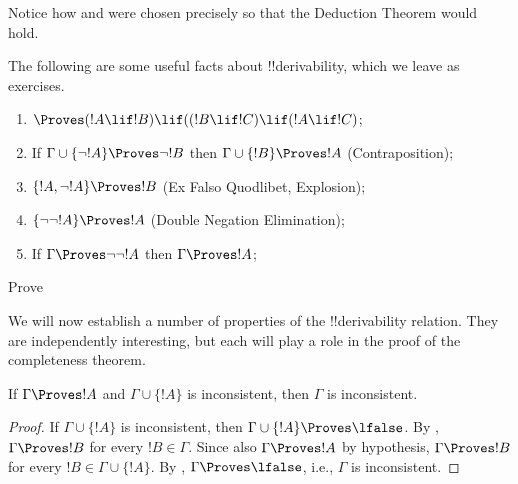 Notice how  and  were chosen
precisely so that the Deduction Theorem would hold.

The following are some useful facts about !!{derivability}, which we
leave as exercises.

\begin{prop}
\begin{enumerate}
\item $\Proves (!A \lif !B) \lif ((!B \lif !C)
  \lif (!A \lif !C)$; 
\item If $\Gamma \cup \{ \lnot !A\}
  \Proves \lnot !B$ then $\Gamma \cup \{ !B\} \Proves
  !A$ (Contraposition); 
\item  $\{ !A, \lnot!A\} \Proves
    !B$ (Ex Falso Quodlibet, Explosion); 
\item  $\{ \lnot\lnot!A\} \Proves
  !A$ (Double Negation Elimination);
\item If $\Gamma \Proves \lnot\lnot!A$ then $\Gamma \Proves
  !A$;
\end{enumerate}
\end{prop}




\begin{prob}
  Prove 
\end{prob}










We will now establish a number of properties of the !!{derivability}
relation.  They are independently interesting, but each will play a
role in the proof of the completeness theorem.

\begin{prop}
  If $\Gamma \Proves !A$ and $\Gamma \cup \{!A\}$ is inconsistent,
  then $\Gamma$ is inconsistent.
\end{prop}

\begin{proof}
  If $\Gamma \cup \{!A\}$ is inconsistent, then $\Gamma \cup \{!A\}
  \Proves \lfalse$. By , $\Gamma \Proves
  !B$ for every $!B \in \Gamma$. Since also $\Gamma \Proves !A$ by
  hypothesis, $\Gamma \Proves !B$ for every $!B \in \Gamma \cup
  \{!A\}$. By , $\Gamma \Proves
  \lfalse$, i.e., $\Gamma$ is inconsistent.
\end{proof}

